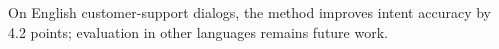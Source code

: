 On English customer-support dialogs, the method improves intent accuracy by 4.2 points; evaluation in other languages remains future work.
